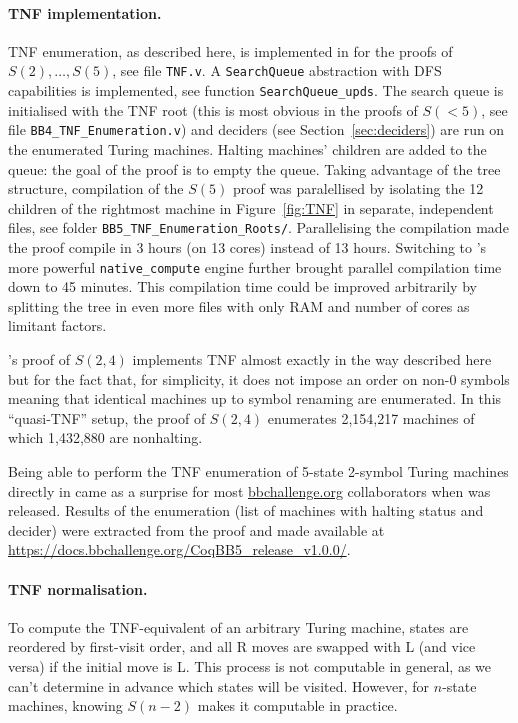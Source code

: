 \paragraph{\CoqBB TNF implementation.} TNF enumeration, as described here, is implemented in \CoqBB for the proofs of $S(2),\dots,S(5)$, see file \texttt{TNF.v}. A \texttt{SearchQueue} abstraction with DFS capabilities is implemented, see function \texttt{SearchQueue\_upds}. The search queue is initialised with the TNF root (this is most obvious in the proofs of $S(<5)$, \eg see file \texttt{BB4\_TNF\_Enumeration.v}) and deciders (see Section~\ref{sec:deciders}) are run on the enumerated Turing machines. Halting machines' children are added to the queue: the goal of the proof is to empty the queue. Taking advantage of the tree structure, compilation of the $S(5)$ proof was paralellised by isolating the 12 children of the rightmost machine in Figure~\ref{fig:TNF} in separate, independent files, see folder \texttt{BB5\_TNF\_Enumeration\_Roots/}. Parallelising the compilation made the proof compile in 3 hours (on 13 cores) instead of 13 hours. Switching to \Coq's more powerful \texttt{native\_compute} engine \cite{nativecompute} further brought parallel compilation time down to 45 minutes. This compilation time could be improved arbitrarily by splitting the tree in even more files with only RAM and number of cores as limitant factors.

\CoqBB's proof of $S(2,4)$ implements TNF almost exactly in the way described here but for the fact that, for simplicity, it does not impose an order on non-0 symbols meaning that identical machines up to symbol renaming are enumerated. In this ``quasi-TNF'' setup, the proof of $S(2,4)$ enumerates 2,154,217 machines of which 1,432,880 are nonhalting.

Being able to perform the TNF enumeration of 5-state 2-symbol Turing machines directly in \Coq came as a surprise for most \url{bbchallenge.org} collaborators when \CoqBB was released. Results of the enumeration (\ie list of machines with halting status and decider) were extracted from the proof and made available at \url{https://docs.bbchallenge.org/CoqBB5_release_v1.0.0/}.




\paragraph{TNF normalisation.} To compute the TNF-equivalent of an arbitrary Turing machine, states are reordered by first-visit order, and all R moves are swapped with L (and vice versa) if the initial move is L. This process is not computable in general, as we can't determine in advance which states will be visited. However, for $n$-state machines, knowing $S(n-2)$ makes it computable in practice. %